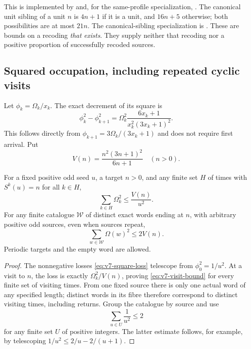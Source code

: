 This is implemented by
 and, for the
same-profile specialization,
.
The canonical unit sibling of a unit $n$ is $4n+1$ if it is a unit,
and $16n+5$ otherwise; both possibilities are at most $21n$.
The canonical-sibling specialization is
.
These are bounds on a recoding \emph{that exists}. They supply neither
that recoding nor a positive proportion of successfully recoded sources.

\subsection{Squared occupation, including repeated cyclic visits}

Let $\phi_k=\Omega_k/x_k$. The exact decrement of its square is
\begin{equation}\label{eq:v7-square-loss}
 \phi_k^2-\phi_{k+1}^2
 =\Omega_k^2\frac{6x_k+1}{x_k^2(3x_k+1)^2}.
\end{equation}
This follows directly from
$\phi_{k+1}=3\Omega_k/(3x_k+1)$ and does not require first arrival.
Put
\[
 V(n)=\frac{n^2(3n+1)^2}{6n+1}\quad(n>0).
\]

\begin{theorem}\label{thm:v7-square}
For a fixed positive odd seed $u$, a target $n>0$, and any finite set
$H$ of times with $S^k(u)=n$ for all $k\in H$,
\begin{equation}\label{eq:v7-visit-bound}
 \sum_{k\in H}\Omega_k^2\le\frac{V(n)}{u^2}.
\end{equation}
For any finite catalogue $\mathcal W$ of distinct exact words ending at
$n$, with arbitrary positive odd sources, even when sources repeat,
\begin{equation}\label{eq:v7-catalogue-square}
 \sum_{w\in\mathcal W}\Omega(w)^2\le2V(n).
\end{equation}
Periodic targets and the empty word are allowed.
\end{theorem}
\begin{proof}
The nonnegative losses \eqref{eq:v7-square-loss} telescope from
$\phi_0^2=1/u^2$. At a visit to $n$, the loss is exactly
$\Omega_k^2/V(n)$, proving \eqref{eq:v7-visit-bound} for every finite
set of visiting times. From one fixed source there is only one actual
word of any specified length; distinct words in its fibre therefore
correspond to distinct visiting times, including returns. Group the
catalogue by source and use
\[
 \sum_{u\in U}\frac1{u^2}\le2
\]
for any finite set $U$ of positive integers. The latter estimate follows,
for example, by telescoping $1/u^2\le2/u-2/(u+1)$.
\end{proof}

